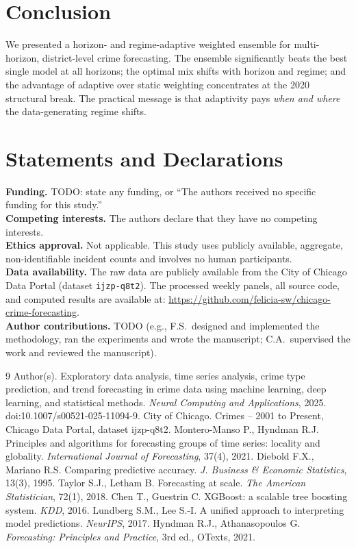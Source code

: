 \documentclass[11pt]{article}
\begin{document}
\section{Conclusion}
We presented a horizon- and regime-adaptive weighted ensemble for multi-horizon, district-level crime
forecasting. The ensemble significantly beats the best single model at all horizons; the optimal mix
shifts with horizon and regime; and the advantage of adaptive over static weighting concentrates at the
2020 structural break. The practical message is that adaptivity pays \emph{when and where} the
data-generating regime shifts.

\section*{Statements and Declarations}
\noindent\textbf{Funding.} TODO: state any funding, or ``The authors received no specific funding for
this study.''\\[2pt]
\textbf{Competing interests.} The authors declare that they have no competing interests.\\[2pt]
\textbf{Ethics approval.} Not applicable. This study uses publicly available, aggregate,
non-identifiable incident counts and involves no human participants.\\[2pt]
\textbf{Data availability.} The raw data are publicly available from the City of Chicago Data Portal
(dataset \texttt{ijzp-q8t2}). The processed weekly panels, all source code, and computed results are
available at: \url{https://github.com/felicia-sw/chicago-crime-forecasting}.\\[2pt]
\textbf{Author contributions.} TODO (e.g., F.S.\ designed and implemented the methodology, ran the
experiments and wrote the manuscript; C.A.\ supervised the work and reviewed the manuscript).

\begin{thebibliography}{9}
 Author(s). Exploratory data analysis, time series analysis, crime type prediction,
and trend forecasting in crime data using machine learning, deep learning, and statistical methods.
\emph{Neural Computing and Applications}, 2025. doi:10.1007/s00521-025-11094-9. %
 City of Chicago. Crimes -- 2001 to Present, Chicago Data Portal, dataset ijzp-q8t2.
 Montero-Manso P., Hyndman R.J. Principles and algorithms for forecasting
groups of time series: locality and globality. \emph{International Journal of Forecasting}, 37(4), 2021.
 Diebold F.X., Mariano R.S. Comparing predictive accuracy. \emph{J. Business \& Economic
Statistics}, 13(3), 1995.
 Taylor S.J., Letham B. Forecasting at scale. \emph{The American Statistician}, 72(1),
2018.
 Chen T., Guestrin C. XGBoost: a scalable tree boosting system. \emph{KDD}, 2016.
 Lundberg S.M., Lee S.-I. A unified approach to interpreting model predictions.
\emph{NeurIPS}, 2017.
 Hyndman R.J., Athanasopoulos G. \emph{Forecasting: Principles and Practice}, 3rd ed.,
OTexts, 2021.
\end{thebibliography}
\end{document}

